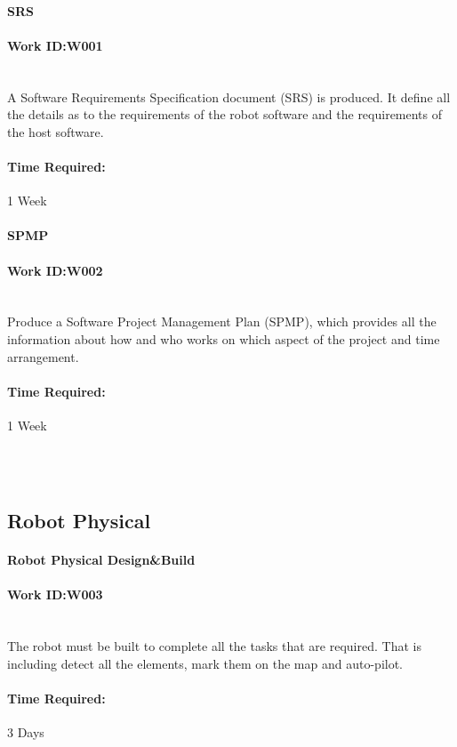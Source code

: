 \documentclass[11pt, a4paper]{report}
\begin{document}
\paragraph{SRS}
\paragraph{Work ID:W001}\\
A Software Requirements Specification document (SRS) is produced. It define all the details as to the requirements of the robot software and the requirements of the host software.
\paragraph{Time Required:}1 Week


\paragraph{SPMP}
\paragraph{Work ID:W002}\\
Produce a Software Project Management Plan (SPMP), which provides all the information about how and who works on which aspect of the project and time arrangement. 
\paragraph{Time Required:}1 Week


\\
\\
\subsection{Robot Physical}
\paragraph{Robot Physical Design&Build}
\paragraph{Work ID:W003}\\
The robot must be built to complete all the tasks that are required. That is including detect all the elements, mark them on the map and auto-pilot.
\paragraph{Time Required:}3 Days
\end{document}
